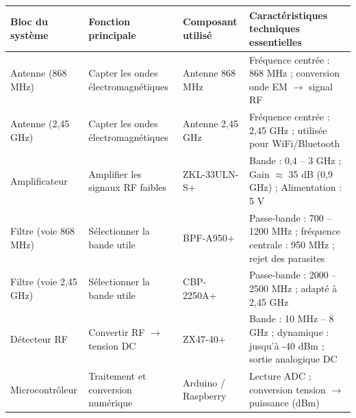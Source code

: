 \documentclass[12pt,a4paper]{article}
\begin{document}

\begin{table}[H]
\centering
\renewcommand{\arraystretch}{1.4}
\begin{tabular}{|p{3cm}|p{4cm}|p{3cm}|p{5cm}|}
\hline
\textbf{Bloc du système} & \textbf{Fonction principale} & \textbf{Composant utilisé} & \textbf{Caractéristiques \;techniques essentielles} \\
\hline

Antenne (868 MHz) & Capter les ondes électromagnétiques & Antenne 868 MHz & Fréquence centrée : 868 MHz ; conversion onde EM $\rightarrow$ signal RF \\
\hline

Antenne (2,45 GHz) & Capter les ondes électromagnétiques & Antenne 2,45 GHz & Fréquence centrée : 2,45 GHz ; utilisée pour WiFi/Bluetooth \\
\hline

Amplificateur & Amplifier les signaux RF faibles & ZKL-33ULN-S+ & Bande : 0,4 -- 3 GHz ; Gain $\approx$ 35 dB (0,9 GHz) ; Alimentation : 5 V \\
\hline

Filtre (voie 868 MHz) & Sélectionner la bande utile & BPF-A950+ & Passe-bande : 700 -- 1200 MHz ; fréquence centrale : 950 MHz ; rejet des parasites \\
\hline

Filtre (voie 2,45 GHz) & Sélectionner la bande utile & CBP-2250A+ & Passe-bande : 2000 -- 2500 MHz ; adapté à 2,45 GHz \\
\hline

Détecteur RF & Convertir RF $\rightarrow$ tension DC & ZX47-40+ & Bande : 10 MHz -- 8 GHz ; dynamique : jusqu'à -40 dBm ; sortie analogique DC \\
\hline

Microcontrôleur & Traitement et conversion numérique & Arduino / Raspberry & Lecture ADC ; conversion tension $\rightarrow$ puissance (dBm) \\
\hline


\end{tabular}
\end{table}
\end{document}
\end{itemize}
\end{document}
